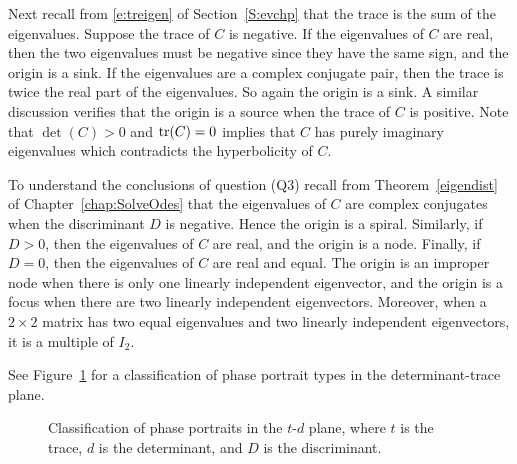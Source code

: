 \documentclass{ximera}
\begin{document}
Next recall from \eqref{e:treigen} of Section~\ref{S:evchp} that the trace is 
the sum of the 
eigenvalues. Suppose the trace of $C$ is negative.  If the eigenvalues
of $C$ are real, then the two eigenvalues must be negative since they
have the same sign, and the origin is a sink.  If the eigenvalues are
a complex conjugate pair, then the trace is twice the real part of the
eigenvalues.  So again the origin is a sink.  A similar discussion
verifies that the origin is a source when the trace of $C$ is positive.
Note that $\det(C)>0$ and ${\rm tr}(C)= 0$ implies that $C$ has purely
imaginary eigenvalues which contradicts the hyperbolicity of $C$.

To understand the conclusions of question (Q3) recall from
Theorem~\ref{eigendist} of Chapter~\ref{chap:SolveOdes} that the 
eigenvalues of $C$ are complex
conjugates when the discriminant $D$ is negative. Hence the origin is
a spiral.  Similarly, if $D>0$, then the eigenvalues of $C$ are real,
and the origin is a node.  Finally, if $D=0$, then the eigenvalues of
$C$ are real and equal.  The origin is an improper node when there is
only one linearly independent eigenvector, and the origin is a focus
when there are two linearly independent eigenvectors.  Moreover, when
a $2\times 2$ matrix has two equal eigenvalues and two linearly
independent eigenvectors, it is a multiple of $I_2$.

See Figure~\ref{F:td} for a classification of phase portrait types
in the determinant-trace plane.

\begin{figure}[htb]
           \centerline{%
           }
           \caption{Classification of phase portraits in the
		$t$-$d$ plane, where $t$ is the trace, $d$ is the
	determinant, and $D$ is the discriminant.}
           \label{F:td}
\end{figure}

\EXER

\end{document}
